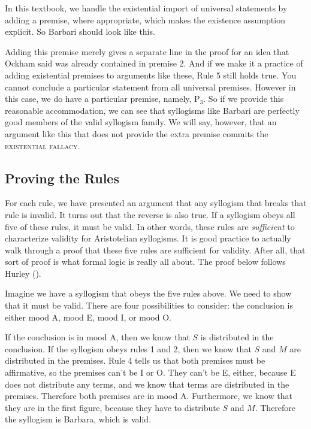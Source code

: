 In this textbook, we handle the existential import of universal statements by adding a premise, where appropriate, which makes the existence assumption explicit. So Barbari should look like this.

\begin{kormanize}
\end{kormanize}

Adding this premise merely gives a separate line in the proof for an idea that Ockham said was already contained in premise 2. And if we make it a practice of adding existential premises to arguments like these, Rule 5 still holds true. You cannot conclude a particular statement from all universal premises. However in this case, we do have a particular premise, namely, P$_3$. So if we provide this reasonable accommodation, we can see that syllogisms like Barbari are perfectly good members of the valid syllogism family. We will say, however, that an argument like this that does not provide the extra premise commits the
\textsc{\gls{existential fallacy}}. \label{def:existential_fallacy}


\subsection{Proving the Rules}

For each rule, we have presented an argument that any syllogism that breaks that rule is invalid. It turns out that the reverse is also true. If a syllogism obeys all five of these rules, it must be valid. In other words, these rules are \emph{sufficient} to characterize validity for Aristotelian syllogisms.  It is good practice to actually walk through a proof that these five rules are sufficient for validity. After all, that sort of proof is what formal logic is really all about. The proof below follows Hurley (\cite*	{Hurley2014}).

Imagine we have a syllogism that obeys the five rules above. We need to show that it must be valid. There are four possibilities to consider: the conclusion is either mood A, mood E, mood I, or mood O.

If the conclusion is in mood A, then we know that $S$ is distributed in the conclusion. If the syllogism obeys rules 1 and 2, then we know that $S$ and $M$ are distributed in the premises. Rule 4 tells us that both premises must be affirmative, so the premises can't be I or O. They can't be E, either, because E does not distribute any terms, and we know that terms are distributed in the premises. Therefore both premises are in mood A. Furthermore, we know that they are in the first figure, because they have to distribute $S$ and $M$. Therefore the syllogism is Barbara, which is valid.

